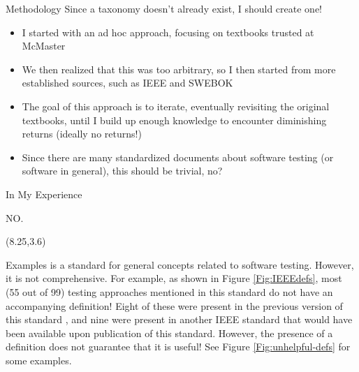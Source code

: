 \documentclass[22pt]{beamer}
\begin{document}
\begin{frame}[fragile]
\begin{textblock}{7.25}
        \begin{block}{\fontsize{37}{20}\selectfont Methodology}
            Since a taxonomy doesn't already exist, I should create one!
            \begin{itemize}
                \item I started with an ad hoc approach, focusing on
                      textbooks trusted at McMaster
                \item We then realized that this was too arbitrary, so
                      I then started from more established sources, such as
                      IEEE and SWEBOK
                \item The goal of this approach is to iterate,
                      eventually revisiting the original textbooks,
                      until I build up enough knowledge to encounter
                      diminishing returns (ideally no returns!)
                \item Since there are many standardized documents about software
                      testing (or software in general), this should be trivial, no?
            \end{itemize}
            \vspace{5mm}
        \end{block}

        \begin{block}{\fontsize{37}{20}\selectfont In My Experience}
            \vspace{5mm}
            \begin{center}
                {\fontsize{185}{20}\selectfont NO.}
            \end{center}
            \vspace{5mm}
        \end{block}
    \end{textblock}

    \begin{textblock}{7.25}(8.25,3.6)
        \begin{block}{\fontsize{37}{20}\selectfont Examples}
            \cite{IEEE2022} is a standard for general concepts related to
            software testing. However, it is not comprehensive. For example, as
            shown in Figure \ref{Fig:IEEEdefs}, most (55 out of 99) testing
            approaches mentioned in this standard do not have an accompanying
            definition! Eight of these were present in the previous version of
            this standard \cite{IEEE2013}, and nine were present in another
            IEEE standard \cite{IEEE2017} that would have been available
            upon publication of this standard. However, the presence of a
            definition does not guarantee that it is useful! See Figure
            \ref{Fig:unhelpful-defs} for some examples.


\end{block}
\end{textblock}
\end{frame}
\end{document}
